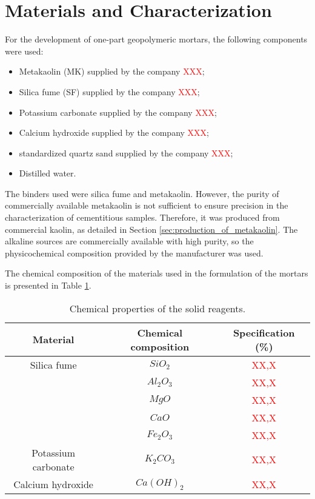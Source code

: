 \section{Materials and Characterization}
\label{sec:materials_and_characterization}

For the development of one-part geopolymeric mortars, the following components were used:

\begin{itemize}
    \item Metakaolin (MK) supplied by the company \textcolor{red}{XXX};
    \item Silica fume (SF) supplied by the company \textcolor{red}{XXX};
    \item Potassium carbonate supplied by the company \textcolor{red}{XXX};
    \item Calcium hydroxide supplied by the company \textcolor{red}{XXX};
    \item standardized quartz sand supplied by the company \textcolor{red}{XXX};
    \item Distilled water.
\end{itemize}

The binders used were silica fume and metakaolin. However, the purity of commercially available metakaolin is not sufficient to ensure precision in the characterization of cementitious samples.
Therefore, it was produced from commercial kaolin, as detailed in Section \ref{sec:production_of_metakaolin}.
The alkaline sources are commercially available with high purity, so the physicochemical composition provided by the manufacturer was used.

The chemical composition of the materials used in the formulation of the mortars is presented in Table \ref{tab:chemical_composition_reagents}.

\begin{table}[H]
    \caption{Chemical properties of the solid reagents.}
    \label{tab:chemical_composition_reagents}
    \center
    \begin{tabular}{ccc}
        \hline
        Material & Chemical composition & Specification (\%)\\
        \hline
        Silica fume & $SiO_2$ &  \textcolor{red}{XX,X} \\
            & $ Al_2O_3$ & \textcolor{red}{XX,X} \\
            & $MgO$ & \textcolor{red}{XX,X} \\
            & $CaO$ & \textcolor{red}{XX,X} \\
            & $Fe_2O_3$ & \textcolor{red}{XX,X} \\
        Potassium carbonate & $K_2CO_3$ & \textcolor{red}{XX,X} \\
        Calcium hydroxide & $Ca(OH)_2$ & \textcolor{red}{XX,X} \\
        \hline
    \end{tabular}
\end{table}

